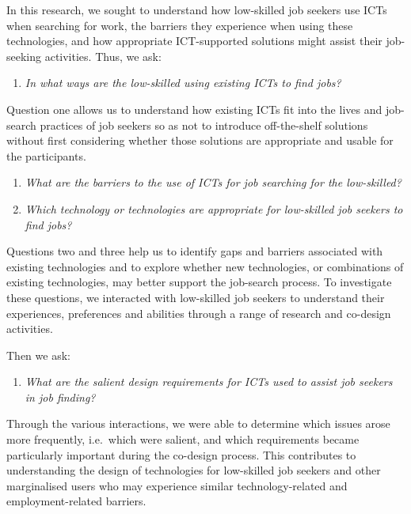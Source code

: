 {\setlength{\parindent}{0pt}
\setlength{\parskip}{1em}

In this research, we sought to understand how low-skilled job seekers use ICTs when searching for work, the barriers they experience when using these technologies, and how appropriate ICT-supported solutions might assist their job-seeking activities. Thus, we ask:

\begin{enumerate}[label=RQ\arabic*:]
    \item \textit{In what ways are the low-skilled using existing ICTs to find jobs?}
\end{enumerate}

Question one allows us to understand how existing ICTs fit into the lives and job-search practices of job seekers so as not to introduce off-the-shelf solutions without first considering whether those solutions are appropriate and usable for the participants.

\begin{enumerate}[label=RQ\arabic*:, resume]
    \item \textit{What are the barriers to the use of ICTs for job searching for the low-skilled?}
    \item \textit{Which technology or technologies are appropriate for low-skilled job seekers to find jobs?}
\end{enumerate}

Questions two and three help us to identify gaps and barriers associated with existing technologies and to explore whether new technologies, or combinations of existing technologies, may better support the job-search process. To investigate these questions, we interacted with low-skilled job seekers to understand their experiences, preferences and abilities through a range of research and co-design activities.

Then we ask:

\begin{enumerate}[label=RQ\arabic*:, resume]
    \item \textit{What are the salient design requirements for ICTs used to assist job seekers in job finding?}
\end{enumerate}

Through the various interactions, we were able to determine which issues arose more frequently, i.e.\ which were salient, and which requirements became particularly important during the co-design process. This contributes to understanding the design of technologies for low-skilled job seekers and other marginalised users who may experience similar technology-related and employment-related barriers.

}
